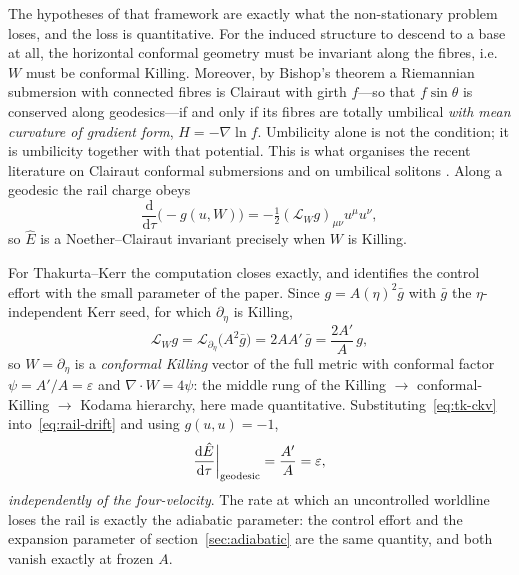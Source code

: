 \documentclass[12pt]{iopart}
\theoremstyle{plain}
\theoremstyle{definition}
\theoremstyle{remark}
\newcommand{\Ehat}{\hat E}
\newcommand{\dd}{\mathrm{d}}
\begin{document}
The hypotheses of that framework are exactly what the non-stationary problem
loses, and the loss is quantitative. For the induced structure to descend to a
base at all, the horizontal conformal geometry must be invariant along the
fibres, i.e.\ $W$ must be conformal Killing. Moreover, by Bishop's theorem
\cite{Bishop1972} a Riemannian submersion with connected fibres is Clairaut with girth
$f$---so that $f\sin\theta$ is conserved along geodesics---if and only if its
fibres are totally umbilical \emph{with mean curvature of gradient form},
$H=-\nabla\ln f$. Umbilicity alone is not the
condition; it is umbilicity together with that potential. This is what organises
the recent literature on Clairaut conformal submersions and on umbilical solitons
\cite{MeenaZawadzki2024,Lecian2026Yamabe,Lecian2026Solitons}.
Along a geodesic the rail charge obeys
\begin{equation}
    \frac{\dd}{\dd\tau}\big(\!-\!g(u,W)\big)
      =-\tfrac12(\mathcal L_Wg)_{\mu\nu}u^\mu u^\nu ,
    \label{eq:rail-drift}
\end{equation}
so $\Ehat$ is a Noether--Clairaut invariant precisely when $W$ is Killing.

For Thakurta--Kerr the computation closes exactly, and identifies the control
effort with the small parameter of the paper. Since $g=A(\eta)^2\bar g$ with
$\bar g$ the $\eta$-independent Kerr seed, for which $\partial_\eta$ is Killing,
\begin{equation}
    \mathcal L_Wg=\mathcal L_{\partial_\eta}\!\big(A^2\bar g\big)
      =2AA'\,\bar g=\frac{2A'}{A}\,g ,
    \label{eq:tk-ckv}
\end{equation}
so $W=\partial_\eta$ is a \emph{conformal Killing} vector of the full metric
with conformal factor $\psi=A'/A=\varepsilon$ and $\nabla\!\cdot\!W=4\psi$: the
middle rung of the Killing $\to$ conformal-Killing $\to$ Kodama hierarchy, here
made quantitative. Substituting~\eqref{eq:tk-ckv} into~\eqref{eq:rail-drift} and
using $g(u,u)=-1$,
\begin{equation}
    \frac{\dd\Ehat}{\dd\tau}\bigg|_{\rm geodesic}=\frac{A'}{A}=\varepsilon ,
    \label{eq:tk-drift}
\end{equation}
\emph{independently of the four-velocity}. The rate at which an uncontrolled
worldline loses the rail is exactly the adiabatic parameter: the control effort
and the expansion parameter of section~\ref{sec:adiabatic} are the same
quantity, and both vanish exactly at frozen $A$.
\end{document}
